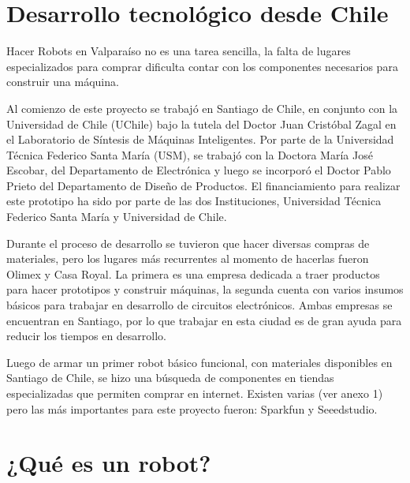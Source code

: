 
\section{Desarrollo tecnológico desde Chile}

Hacer Robots en Valparaíso no es una tarea sencilla, la falta de lugares especializados para comprar dificulta contar con los componentes necesarios para construir una máquina.

Al comienzo de este proyecto se trabajó en Santiago de Chile, en conjunto con la Universidad de Chile (UChile) bajo la tutela del Doctor Juan Cristóbal Zagal en el Laboratorio de Síntesis de Máquinas Inteligentes. Por parte de la Universidad Técnica Federico Santa María (USM), se trabajó con la Doctora María José Escobar, del Departamento de Electrónica y luego se incorporó el Doctor Pablo Prieto del Departamento de Diseño de Productos. El financiamiento para realizar este prototipo ha sido por parte de las dos Instituciones, Universidad Técnica Federico Santa María y Universidad de Chile.

Durante el proceso de desarrollo se tuvieron que hacer diversas compras de materiales, pero los lugares más recurrentes al momento de hacerlas fueron Olimex y Casa Royal. La primera es una empresa dedicada a traer productos para hacer prototipos y construir máquinas, la segunda cuenta con varios insumos básicos para trabajar en desarrollo de circuitos electrónicos. Ambas empresas se encuentran en Santiago, por lo que trabajar en esta ciudad es de gran ayuda para reducir los tiempos en desarrollo.

Luego de armar un primer robot básico funcional, con materiales disponibles en Santiago de Chile, se hizo una búsqueda de componentes en tiendas especializadas que permiten comprar en internet. Existen varias (ver anexo 1) pero las más importantes para este proyecto fueron: Sparkfun y Seeedstudio.





\section{¿Qué es un robot?}

